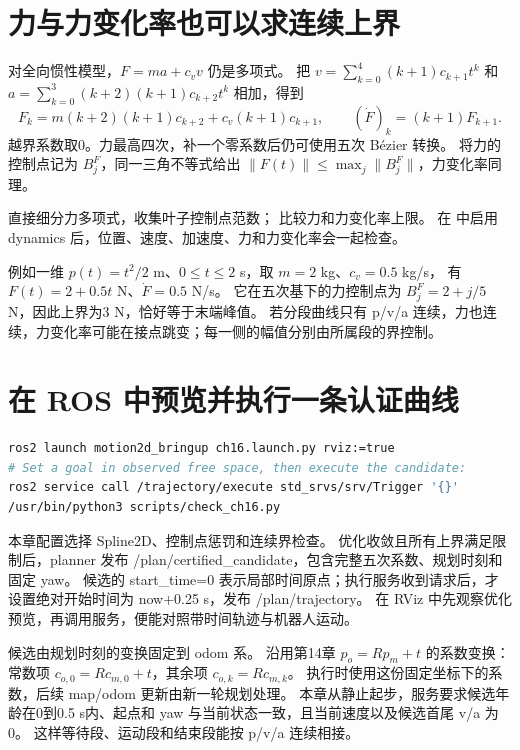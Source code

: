 \section{力与力变化率也可以求连续上界}
对全向惯性模型，$F=ma+c_vv$ 仍是多项式。
把 $v=\sum_{k=0}^4(k+1)c_{k+1}t^k$ 和
$a=\sum_{k=0}^3(k+2)(k+1)c_{k+2}t^k$ 相加，得到
\begin{equation}
 F_k=m(k+2)(k+1)c_{k+2}+c_v(k+1)c_{k+1},\qquad
 (\dot F)_k=(k+1)F_{k+1}.
\end{equation}
越界系数取0。力最高四次，补一个零系数后仍可使用五次 Bézier 转换。
将力的控制点记为 $B_j^F$，同一三角不等式给出
$\|F(t)\|\le\max_j\|B_j^F\|$，力变化率同理。
\par\noindent\begin{minipage}{\linewidth}

\end{minipage}\par
{} 直接细分力多项式，收集叶子控制点范数； 比较力和力变化率上限。
在  中启用 dynamics 后，位置、速度、加速度、力和力变化率会一起检查。

例如一维 $p(t)=t^2/2$ m、$0\le t\le2$ s，取 $m=2$ kg、$c_v=0.5$ kg/s，
有 $F(t)=2+0.5t$ N、$\dot F=0.5$ N/s。
它在五次基下的力控制点为 $B_j^F=2+j/5$ N，因此上界为3 N，恰好等于末端峰值。
若分段曲线只有 p/v/a 连续，力也连续，力变化率可能在接点跳变；每一侧的幅值分别由所属段的界控制。

\clearpage
\section{在 ROS 中预览并执行一条认证曲线}
\begin{lstlisting}[language=bash]
ros2 launch motion2d_bringup ch16.launch.py rviz:=true
# Set a goal in observed free space, then execute the candidate:
ros2 service call /trajectory/execute std_srvs/srv/Trigger '{}'
/usr/bin/python3 scripts/check_ch16.py
\end{lstlisting}
本章配置选择 Spline2D、控制点惩罚和连续界检查。
优化收敛且所有上界满足限制后，planner 发布 /plan/certified\_candidate，包含完整五次系数、规划时刻和固定 yaw。
候选的 start\_time=0 表示局部时间原点；执行服务收到请求后，才设置绝对开始时间为 now+0.25 s，发布 /plan/trajectory。
在 RViz 中先观察优化预览，再调用服务，便能对照带时间轨迹与机器人运动。

候选由规划时刻的变换固定到 odom 系。
沿用第14章 $p_o=Rp_m+t$ 的系数变换：常数项 $c_{o,0}=Rc_{m,0}+t$，其余项 $c_{o,k}=Rc_{m,k}$。
执行时使用这份固定坐标下的系数，后续 map/odom 更新由新一轮规划处理。
本章从静止起步，服务要求候选年龄在0到0.5 s内、起点和 yaw 与当前状态一致，且当前速度以及候选首尾 v/a 为0。
这样等待段、运动段和结束段能按 p/v/a 连续相接。

